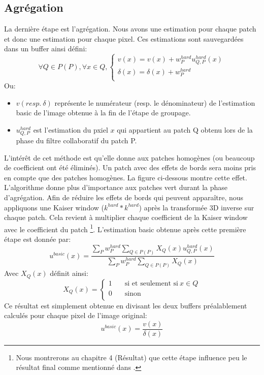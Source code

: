 \subsection{Agrégation}
La dernière étape est l'agrégation. Nous avons une estimation pour chaque patch et donc une estimation pour chaque pixel. Ces estimations sont sauvegardées dans un buffer ainsi défini:
\[ \forall Q \in  P(P), \forall x \in Q, 
  \begin{cases}
    v(x) = v(x) + w^{hard}_P u^{hard}_{Q,P}(x) \\
    \delta(x) = \delta(x) + w^{hard}_P  \\
  \end{cases}
\]
Ou:
\begin{itemize}
\item \(v (resp. \: \delta ) \) représente le numérateur (resp. le dénominateur) de l'estimation basic de l'image obtenue à la fin de l'étape de groupage.
\item \(u^{hard}_{Q,P} \) est l'estimation du pxiel \(x \) qui appartient au patch Q obtenu lors de la phase du filtre collaboratif du patch P.
\end{itemize}
\newpage
L'intérêt de cet méthode est qu'elle donne aux patches homogènes (ou beaucoup de coefficient ont été éliminés). Un patch avec des effets de bords sera moins pris en compte que des patches homogènes. La figure ci-dessous montre cette effet. L'algorithme donne plus d'importance aux patches vert durant la phase d'agrégation.
\newline
\newline
Afin de réduire les effets de bords qui peuvent apparaître, nous appliquons une Kaiser window (\( k^{hard} * k^{hard}\)) après la transformée 3D inverse sur chaque patch. Cela revient à multiplier chaque coefficient de la Kaiser window avec le coefficient du patch \footnote{Nous montrerons au chapitre 4 (Résultat) que cette étape influence peu le résultat final comme mentionné dans \cite{2}.}.  
\newline 
\newline
L'estimation basic obtenue après cette première étape est donnée par:
\begin{equation}
u^{basic}(x) = \frac{\displaystyle\sum_{P}w^{hard}_P \displaystyle\sum_{Q \in P(P)}X_Q(x)u^{hard}_{Q,P}(x)}{\displaystyle\sum_{P}w^{hard}_P \displaystyle\sum_{Q \in P(P)}X_Q(x)}
\end{equation}
Avec \(X_Q(x)\) définit ainsi:
\[ X_Q(x) =
  \begin{cases}
    1       & \quad \text{si et seulement si} \: x  \in Q \\
    0       & \quad \text{sinon}\\
  \end{cases}
\]
Ce résultat est simplement obtenue en divisant les deux buffers préalablement calculés pour chaque pixel de l'image original: 
\begin{equation}
u^{basic}(x) = \frac{v(x)}{\delta(x)}
\end{equation}
\newpage

